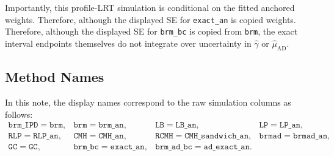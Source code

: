 \documentclass[11pt,a4paper]{article}
\begin{document}
Importantly, this profile-LRT simulation is conditional on the fitted anchored
weights.  Therefore, although the displayed SE for \texttt{exact\_an} is copied
weights.  Therefore, although the displayed SE for \texttt{brm\_bc} is copied
from \texttt{brm}, the exact interval endpoints themselves do not integrate
over uncertainty in \(\widehat\gamma\) or \(\widehat\mu_{\mathrm{AD}}\).

\subsection{Method Names}

In this note, the display names correspond to the raw simulation columns as
follows:
\[
\begin{array}{llll}
\texttt{brm\_IPD}=\texttt{brm},&
\texttt{brm}=\texttt{brm\_an},&
\texttt{LB}=\texttt{LB\_an},&
\texttt{LP}=\texttt{LP\_an},\\
\texttt{RLP}=\texttt{RLP\_an},&
\texttt{CMH}=\texttt{CMH\_an},&
\texttt{RCMH}=\texttt{CMH\_sandwich\_an},&
\texttt{brmad}=\texttt{brmad\_an},\\
\texttt{GC}=\texttt{GC},&
\texttt{brm\_bc}=\texttt{exact\_an},&
\texttt{brm\_ad\_bc}=\texttt{ad\_exact\_an}.&
\end{array}
\]
\end{document}

